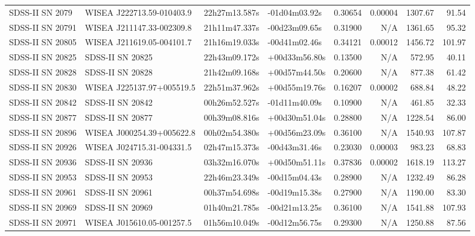 \begin{longtable}{llllrrrr}
SDSS-II SN 2079  &       WISEA J222713.59-010403.9 &   22h27m13.587s &   -01d04m03.92s &  0.30654 &  0.00004 &  1307.67 &       91.54 \\
SDSS-II SN 20791 &       WISEA J211147.33-002309.8 &   21h11m47.337s &   -00d23m09.65s &  0.31900 &      N/A &  1361.65 &       95.32 \\
SDSS-II SN 20805 &       WISEA J211619.05-004101.7 &   21h16m19.033s &   -00d41m02.46s &  0.34121 &  0.00012 &  1456.72 &      101.97 \\
SDSS-II SN 20825 &                SDSS-II SN 20825 &   22h43m09.172s &   +00d33m56.80s &  0.13500 &      N/A &   572.95 &       40.11 \\
SDSS-II SN 20828 &                SDSS-II SN 20828 &   21h42m09.168s &   +00d57m44.50s &  0.20600 &      N/A &   877.38 &       61.42 \\
SDSS-II SN 20830 &       WISEA J225137.97+005519.5 &   22h51m37.962s &   +00d55m19.76s &  0.16207 &  0.00002 &   688.84 &       48.22 \\
SDSS-II SN 20842 &                SDSS-II SN 20842 &   00h26m52.527s &   -01d11m40.09s &  0.10900 &      N/A &   461.85 &       32.33 \\
SDSS-II SN 20877 &                SDSS-II SN 20877 &   00h39m08.816s &   +00d30m51.04s &  0.28800 &      N/A &  1228.54 &       86.00 \\
SDSS-II SN 20896 &       WISEA J000254.39+005622.8 &   00h02m54.380s &   +00d56m23.09s &  0.36100 &      N/A &  1540.93 &      107.87 \\
SDSS-II SN 20926 &       WISEA J024715.31-004331.5 &   02h47m15.373s &   -00d43m31.46s &  0.23030 &  0.00003 &   983.23 &       68.83 \\
SDSS-II SN 20936 &                SDSS-II SN 20936 &   03h32m16.070s &   +00d50m51.11s &  0.37836 &  0.00002 &  1618.19 &      113.27 \\
SDSS-II SN 20953 &                SDSS-II SN 20953 &   22h46m23.349s &   -00d15m04.43s &  0.28900 &      N/A &  1232.49 &       86.28 \\
SDSS-II SN 20961 &                SDSS-II SN 20961 &   00h37m54.698s &   -00d19m15.38s &  0.27900 &      N/A &  1190.00 &       83.30 \\
SDSS-II SN 20969 &                SDSS-II SN 20969 &   01h40m21.785s &   -00d21m13.25s &  0.36100 &      N/A &  1541.88 &      107.93 \\
SDSS-II SN 20971 &       WISEA J015610.05-001257.5 &   01h56m10.049s &   -00d12m56.75s &  0.29300 &      N/A &  1250.88 &       87.56 \\

\end{longtable}
